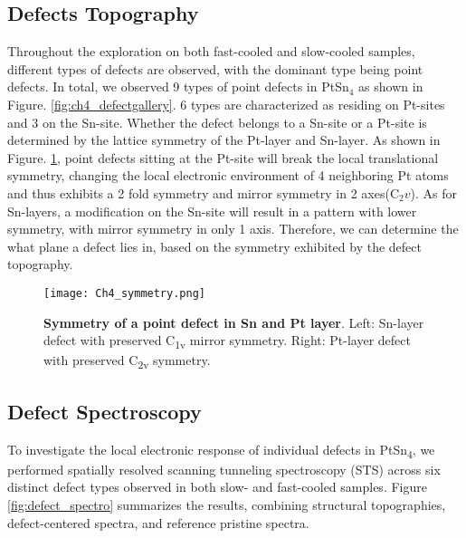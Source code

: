\subsection{Defects Topography}
Throughout the exploration on both fast-cooled and slow-cooled samples, different types of defects are observed, with the dominant type being point defects. In total, we observed 9 types of point defects in PtSn$_4$ as shown in Figure. \ref{fig:ch4_defectgallery}. 6 types are characterized as residing on Pt-sites and 3 on the Sn-site. Whether the defect belongs to a Sn-site or a Pt-site is determined by the lattice symmetry of the Pt-layer and Sn-layer. As shown in Figure. \ref{fig:ch4_symmetry}, point defects sitting at the Pt-site will break the local translational symmetry, changing the local electronic environment of 4 neighboring Pt atoms and thus exhibits a 2 fold symmetry and mirror symmetry in 2 axes(C$_2v$). As for Sn-layers, a modification on the Sn-site will result in a pattern with lower symmetry, with mirror symmetry in only 1 axis. Therefore, we can determine the what plane a defect lies in, based on the symmetry exhibited by the defect topography. 

\begin{figure}
	\centering
	\texttt{[image: Ch4\_symmetry.png]}
	\caption[\textbf{Symmetry of a point defect on Sn and Pt layer}]{\textbf{Symmetry of a point defect in Sn and Pt layer}. Left: Sn-layer defect with preserved C\textsubscript{1v} mirror symmetry. Right: Pt-layer defect with preserved C\textsubscript{2v} symmetry.}
	\label{fig:ch4_symmetry}
\end{figure}


\subsection{Defect Spectroscopy}\label{section:defect_spectro}
To investigate the local electronic response of individual defects in PtSn\textsubscript{4}, we performed spatially resolved scanning tunneling spectroscopy (STS) across six distinct defect types observed in both slow- and fast-cooled samples. Figure \ref{fig:defect_spectro} summarizes the results, combining structural topographies, defect-centered spectra, and reference pristine spectra.

